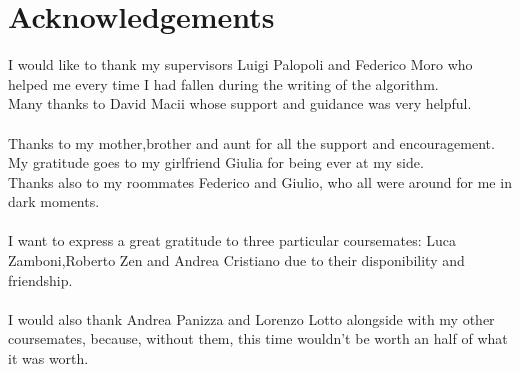 \chapter*{Acknowledgements}
\thispagestyle{empty}

I would like to thank my supervisors Luigi Palopoli and Federico Moro who helped me every time I had fallen during the writing of the algorithm.
\\
Many thanks to David Macii whose support and guidance was very helpful.
\\ \\
Thanks to my mother,brother and aunt for all the support and encouragement.
\\
My gratitude goes to my girlfriend Giulia for being ever at my side.
\\
Thanks also to my roommates Federico and Giulio, who all were around for me in dark moments.
\\ \\ 
I want to express a great gratitude to three particular coursemates: Luca Zamboni,Roberto Zen and Andrea Cristiano due to their disponibility and friendship.
\\ \\
I would also thank Andrea Panizza and Lorenzo Lotto alongside with my other coursemates, because, without them, this time wouldn't be worth an half of what it was worth.

